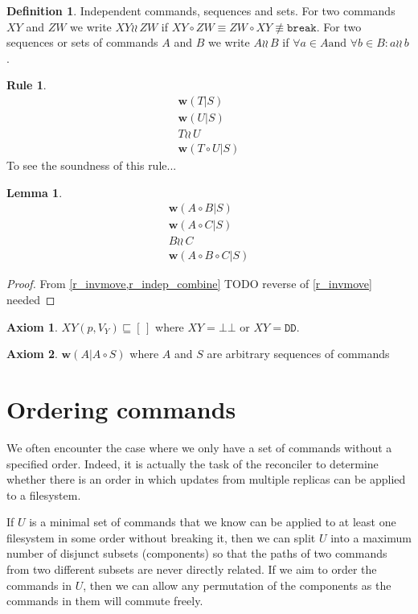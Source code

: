 \documentclass[12pt]{article}
\newcommand{\empt}{\bot}
\newcommand{\cbrk}{\mathtt{break}}
\newcommand{\fscommand}[2]{{#1#2}}
\newcommand{\fsregcommandchar}[1]{\mathtt{#1}}
\newcommand{\fsregcommand}[2]{\fscommand{\fsregcommandchar{#1}}{\fsregcommandchar{#2}}}
\newcommand{\cbb}{\fsregcommand{\empt}{\empt}}
\newcommand{\cdd}{\fsregcommand{D}{D}}
\newcommand{\cxy}{\fscommand{X}{Y}}
\newcommand{\czw}{\fscommand{Z}{W}}
\newcommand{\cc}{\circ} %
\newcommand{\eqext}{\sqsubseteq}
\newcommand{\nequiv}{\not\equiv}
\newcommand{\indep}{\wr\!\!\wr\,} %
\newcommand{\worksc}[2]{{\mathbf{w}}({#1}|{#2})}
\newcommand{\emptyseq}{[\,]} %
\newcommand{\inferrr}[4]{\begin{array}{c}{#1}\\{#2}\\{#3}\\\hline{#4}\end{array}}
\theoremstyle{definition}
\newtheorem{mydef}{Definition}
\newtheorem{myax}{Axiom}
\newtheorem{mylem}{Lemma}
\newtheorem{myrul}{Rule}
\begin{document}
\begin{mydef}{Independent commands, sequences and sets.}
For two commands $\cxy$ and $\czw$ we write $\cxy\indep\czw$ if $\cxy\cc \czw\equiv\czw\cc \cxy\nequiv\cbrk$.
For two sequences or sets of commands $A$ and $B$ we write $A\indep B$ if
$\forall a\in A \mbox{and~} \forall b\in B: a\indep b$.
\end{mydef}

\begin{myrul}\label{r_indep_combine}
\[ \inferrr{\worksc{T}{S}}{\worksc{U}{S}}{T\indep U}{\worksc{T\cc U}{S}} \]
To see the soundness of this rule...
\end{myrul}

\begin{mylem}\label{indep_prefix_combine}
\[ \inferrr{\worksc{A\cc B}{S}}{\worksc{A\cc C}{S}}{B\indep C}{\worksc{A\cc B\cc C}{S}} \]
\end{mylem}
\begin{proof}
From \cref{r_invmove,r_indep_combine}
TODO reverse of \cref{r_invmove} needed
\end{proof}








\begin{myax}\label{ax_assert}
$\cxy(p,V_Y) \eqext \emptyseq$ where $\cxy=\cbb$ or $\cxy=\cdd$.
\end{myax}

\begin{myax}\label{worksextpostfix}
$\worksc{A}{A\cc S}$ where $A$ and $S$ are arbitrary sequences of commands
\end{myax}





\section{Ordering commands}

We often encounter the case where we only have a set of commands without a specified order.
Indeed, it is actually the task of the reconciler to determine whether there is an order
in which updates from multiple replicas can be applied to a filesystem.

If $U$ is a minimal set of commands
that we know can be applied to at least one filesystem in some order without breaking it,
then we can split $U$ into a maximum number of disjunct subsets
(components) so that the paths of two commands from two different subsets are never directly related.
If we aim to order the commands in $U$, then we can allow any permutation of 
the components as the commands in them will commute freely.
\end{document}
